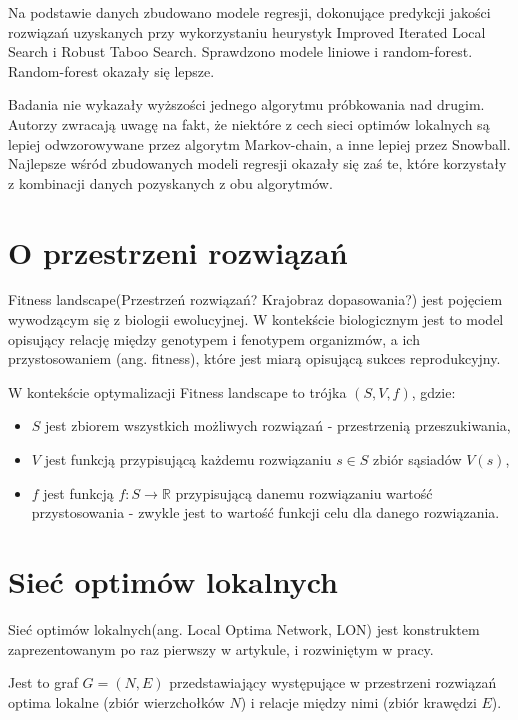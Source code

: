 Na podstawie danych zbudowano modele regresji, dokonujące predykcji jakości rozwiązań
uzyskanych przy wykorzystaniu heurystyk Improved Iterated Local Search i Robust Taboo Search.
Sprawdzono modele liniowe i random-forest. Random-forest okazały się lepsze.

Badania nie wykazały wyższości jednego algorytmu próbkowania nad drugim. Autorzy zwracają uwagę na fakt, że niektóre z cech
sieci optimów lokalnych są lepiej odwzorowywane przez algorytm Markov-chain, a inne lepiej przez Snowball.
Najlepsze wśród zbudowanych modeli regresji okazały się zaś te, które korzystały z kombinacji danych pozyskanych z obu algorytmów.


\section{O przestrzeni rozwiązań}
Fitness landscape(Przestrzeń rozwiązań? Krajobraz dopasowania?) jest pojęciem wywodzącym się z biologii ewolucyjnej.
W kontekście biologicznym jest to model opisujący relację między genotypem i fenotypem organizmów, a ich przystosowaniem (ang. fitness),
które jest miarą opisującą sukces reprodukcyjny\cite{FRAGATA201969}.

W kontekście optymalizacji Fitness landscape to trójka $(S, V, f)$, gdzie:
\begin{itemize}
    \item $S$ jest zbiorem wszystkich możliwych rozwiązań - przestrzenią przeszukiwania,
    \item $V$ jest funkcją przypisującą każdemu rozwiązaniu $s\in{S}$ zbiór sąsiadów $V(s)$,
    \item $f$ jest funkcją $f:S \rightarrow \mathbb{R}$ przypisującą danemu rozwiązaniu wartość przystosowania
          - zwykle jest to wartość funkcji celu dla danego rozwiązania.
\end{itemize}

\section{Sieć optimów lokalnych}
Sieć optimów lokalnych(ang. Local Optima Network, LON) jest konstruktem zaprezentowanym po raz pierwszy w artykule\cite{PhysRevE.78.066114},
i rozwiniętym w pracy\cite{DBLP:journals/corr/OchoaVDT14}.

Jest to graf $G = (N, E)$ przedstawiający występujące w przestrzeni rozwiązań optima lokalne (zbiór wierzchołków $N$)
i relacje między nimi (zbiór krawędzi $E$).

